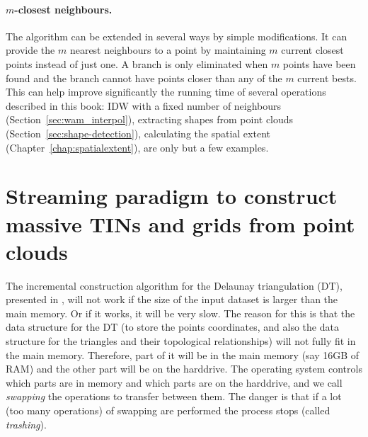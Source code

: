 \paragraph{$m$-closest neighbours.}
The algorithm can be extended in several ways by simple modifications. 
It can provide the $m$ nearest neighbours to a point by maintaining $m$ current closest points instead of just one. 
A branch is only eliminated when $m$ points have been found and the branch cannot have points closer than any of the $m$ current bests. 
This can help improve significantly the running time of several operations described in this book: IDW with a fixed number of neighbours (Section~\ref{sec:wam_interpol}), extracting shapes from point clouds (Section~\ref{sec:shape-detection}), calculating the spatial extent (Chapter~\ref{chap:spatialextent}), are only but a few examples.



%
\section[Streaming paradigm]{Streaming paradigm to construct massive TINs and grids from point clouds}%
\label{sec:streaming}

The incremental construction algorithm for the Delaunay triangulation (DT), presented in , will not work if the size of the input dataset is larger than the main memory.
Or if it works, it will be very slow.
The reason for this is that the data structure for the DT (to store the points coordinates, and also the data structure for the triangles and their topological relationships) will not fully fit in the main memory.
Therefore, part of it will be in the main memory (say 16GB of RAM) and the other part will be on the harddrive.
The operating system controls which parts are in memory and which parts are on the harddrive, and we call \emph{swapping} the operations to transfer between them.
The danger is that if a lot (too many operations) of swapping are performed the process stops (called \emph{trashing}).

%


